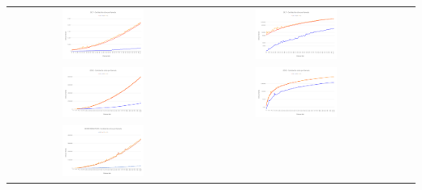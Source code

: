 \begin{center}
	\begin{tabular}{cccc}
	  \includegraphics[width=0.45\textwidth]{imagenes/testperformance/BLITperformance.png} &
	  \includegraphics[width=0.45\textwidth]{imagenes/testperformance/BLITperformanceLOG.png} \\
	  \includegraphics[width=0.45\textwidth]{imagenes/testperformance/EDGEperformanceLIN.png} &
	  \includegraphics[width=0.45\textwidth]{imagenes/testperformance/EDGEperformanceLOG.png} \\
	  \includegraphics[width=0.45\textwidth]{imagenes/testperformance/MONOperformanceLIN.png} &

\end{tabular}
\end{center}
